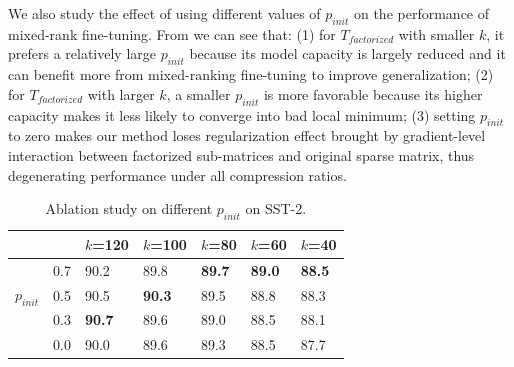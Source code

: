 We also study the effect of using different values of $p_{init}$ on the performance of mixed-rank fine-tuning. From  we can see that: (1) for $T_{factorized}$ with smaller $k$, it prefers a relatively large $p_{init}$ because its model capacity is largely reduced and it can benefit more from mixed-ranking fine-tuning to improve generalization; (2) for $T_{factorized}$ with larger $k$, a smaller $p_{init}$ is more favorable because its higher capacity makes it less likely to converge into bad local minimum; (3) setting $p_{init}$ to zero makes our method loses regularization effect brought by gradient-level interaction between factorized sub-matrices and original sparse matrix, thus degenerating performance under all compression ratios.
\begin{table}[th]
	\centering
	\scriptsize
	\begin{tabular}{|cl|lllll|}
\hline
		&     & $k$=120 & $k$=100 & $k$=80 & $k$=60 & $k$=40   \\
\hline
		\multirow{3}{*}{$p_{init}$} & 0.7 & 90.2  & 89.8  & \textbf{89.7} & \textbf{89.0} & \textbf{88.5} \\
		& 0.5 & 90.5  & \textbf{90.3}  & 89.5 & 88.8 & 88.3 \\
		& 0.3 & \textbf{90.7}  & 89.6  & 89.0 & 88.5 & 88.1 \\
		& 0.0     & 90.0  & 89.6  & 89.3 & 88.5 & 87.7 \\
\hline
	\end{tabular}
	\caption{Ablation study on different $p_{init}$ on SST-2.
	}
	\label{table:diffp}
\end{table}


